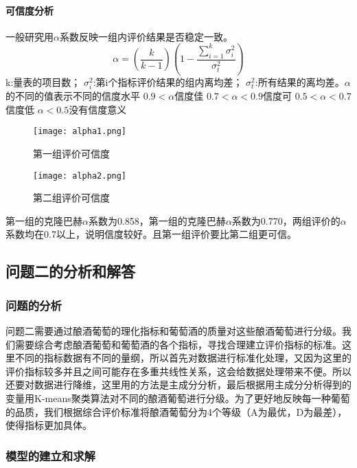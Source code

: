 \documentclass[UTF8,12.05pt]{ctexart}
\begin{document}
\paragraph{可信度分析}
一般研究用$\alpha$系数反映一组内评价结果是否稳定一致。
$$\alpha=(\frac{k}{k-1})(1-\frac{\sum_{i=1}^{k}\sigma_{i}^{2}}{\sigma_{t}^{2}})$$
k:量表的项目数；
$\sigma_{i}^{2}$:第i个指标评价结果的组内离均差；
$\sigma_{t}^{2}$:所有结果的离均差。$\alpha$的不同的值表示不同的信度水平
\newline
$0.9<\alpha$信度佳
\newline
$0.7<\alpha<0.9$信度可
\newline
$0.5<\alpha<0.7$信度低
\newline
$\alpha<0.5$没有信度意义
\begin{figure}[H]
\begin{minipage}{0.5\linewidth}\centering
   \texttt{[image: alpha1.png]}\caption{第一组评价可信度}
\end{minipage}
\begin{minipage}{0.5\linewidth}\centering
  \texttt{[image: alpha2.png]}\caption{第二组评价可信度}
\end{minipage}
\end{figure}
第一组的克隆巴赫$\alpha$系数为0.858，第一组的克隆巴赫$\alpha$系数为0.770，两组评价的$\alpha$系数均在0.7以上，说明信度较好。且第一组评价要比第二组更可信。
\subsection{\heiti{}问题二的分析和解答}
\subsubsection{\heiti{}问题的分析}
问题二需要通过酿酒葡萄的理化指标和葡萄酒的质量对这些酿酒葡萄进行分级。我们需要综合考虑酿酒葡萄和葡萄酒的各个指标，寻找合理建立评价指标的标准。这里不同的指标数据有不同的量纲，所以首先对数据进行标准化处理，又因为这里的评价指标较多并且之间可能存在多重共线性关系，这会给数据处理带来不便。所以还要对数据进行降维，这里用的方法是主成分分析，最后根据用主成分分析得到的变量用K-means聚类算法对不同的酿酒葡萄进行分级。为了更好地反映每一种葡萄的品质，我们根据综合评价标准将酿酒葡萄分为4个等级（A为最优，D为最差），使得指标更加具体。
\subsubsection{\heiti{}模型的建立和求解}
\end{document}

